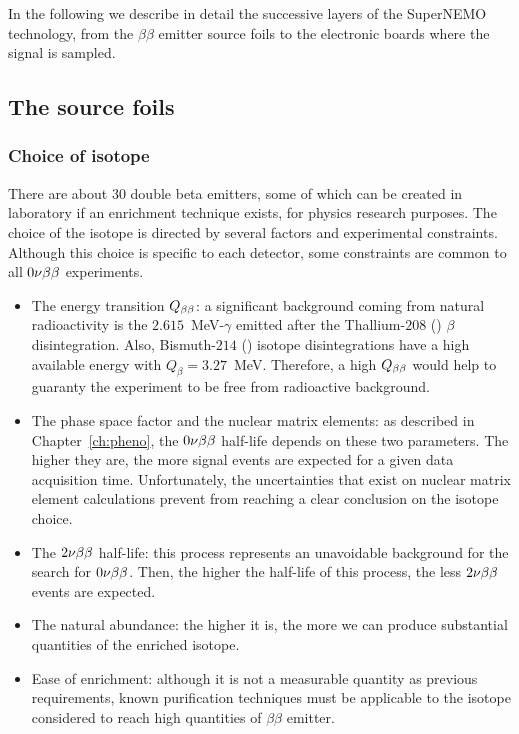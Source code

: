 In the following we describe in detail the successive layers of the SuperNEMO technology, from the $\beta\beta$ emitter source foils to the electronic boards where the signal is sampled.


\subsection{The source foils}

\subsubsection*{Choice of isotope}

There are about $30$ double beta emitters, some of which can be created in laboratory if an enrichment technique exists, for physics research purposes.
The choice of the isotope is directed by several factors and experimental constraints.
Although this choice is specific to each detector, some constraints are common to all $0\nu\beta\beta$ experiments.
\begin{itemize}
\item The energy transition $Q_{\beta\beta}$: a significant background coming from natural radioactivity is the $2.615$~MeV-$\gamma$ emitted after the Thallium-$208$ (\Tl) $\beta$ disintegration.
  Also, Bismuth-$214$ (\Bi) isotope disintegrations have a high available energy with ${Q_{\beta}=3.27}$~MeV.
  Therefore, a high $Q_{\beta\beta}$ would help to guaranty the experiment to be free from radioactive background.
\item The phase space factor and the nuclear matrix elements: as described in Chapter~\ref{ch:pheno}, the $0\nu\beta\beta$ half-life depends on these two parameters.
  The higher they are, the more signal events are expected for a given data acquisition time.
  Unfortunately, the uncertainties that exist on nuclear matrix element calculations prevent from reaching a clear conclusion on the isotope choice.
\item The $2\nu\beta\beta$ half-life: this process represents an unavoidable background for the search for $0\nu\beta\beta$.
Then, the higher the half-life of this process, the less $2\nu\beta\beta$ events are expected.
\item The natural abundance: the higher it is, the more we can produce substantial quantities of the enriched isotope.
\item Ease of enrichment: although it is not a measurable quantity as previous requirements, known purification techniques must be applicable to the isotope considered to reach high quantities of $\beta\beta$ emitter.
\end{itemize}
